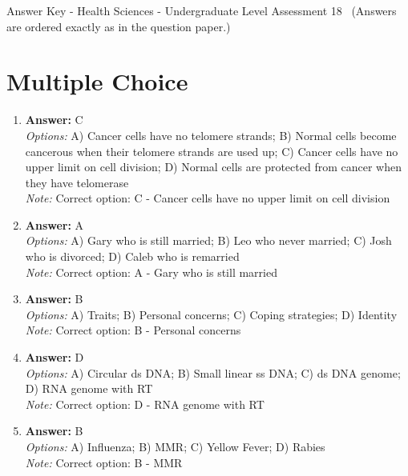 \documentclass[12pt]{article}
\begin{document}
\begin{center}
Answer Key - Health Sciences - Undergraduate Level Assessment 18 \
\small (Answers are ordered exactly as in the question paper.)
\end{center}

\section*{Multiple Choice}
\begin{enumerate}[label=\arabic*.]
\item \textbf{Answer:} C
\\ \textit{Options:} A) Cancer cells have no telomere strands; B) Normal cells become cancerous when their telomere strands are used up; C) Cancer cells have no upper limit on cell division; D) Normal cells are protected from cancer when they have telomerase
\\ \textit{Note:} Correct option: C - Cancer cells have no upper limit on cell division
\item \textbf{Answer:} A
\\ \textit{Options:} A) Gary who is still married; B) Leo who never married; C) Josh who is divorced; D) Caleb who is remarried
\\ \textit{Note:} Correct option: A - Gary who is still married
\item \textbf{Answer:} B
\\ \textit{Options:} A) Traits; B) Personal concerns; C) Coping strategies; D) Identity
\\ \textit{Note:} Correct option: B - Personal concerns
\item \textbf{Answer:} D
\\ \textit{Options:} A) Circular ds DNA; B) Small linear ss DNA; C) ds DNA genome; D) RNA genome with RT
\\ \textit{Note:} Correct option: D - RNA genome with RT
\item \textbf{Answer:} B
\\ \textit{Options:} A) Influenza; B) MMR; C) Yellow Fever; D) Rabies
\\ \textit{Note:} Correct option: B - MMR
\end{enumerate}
\end{document}

